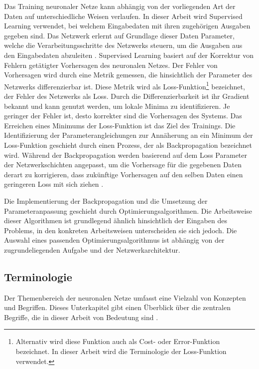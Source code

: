 Das Training neuronaler Netze kann abhängig von der vorliegenden Art der Daten auf unterschiedliche Weisen verlaufen. In dieser Arbeit wird Supervised Learning verwendet, bei welchem Eingabedaten mit ihren zugehörigen Ausgaben gegeben sind. Das Netzwerk erlernt auf Grundlage dieser Daten Parameter, welche die Verarbeitungsschritte des Netzwerks steuern, um die Ausgaben aus den Eingabedaten abzuleiten \cite{nn_terminology}. Supervised Learning basiert auf der Korrektur von Fehlern getätigter Vorhersagen des neuronalen Netzes. Der Fehler von Vorhersagen wird durch eine Metrik gemessen, die hinsichtlich der Parameter des Netzwerks differenzierbar ist. Diese Metrik wird als Loss-Funktion\footnote{Alternativ wird diese Funktion auch als Cost- oder Error-Funktion bezeichnet. In dieser Arbeit wird die Terminologie der Loss-Funktion verwendet.} bezeichnet, der Fehler des Netzwerks als Loss. Durch die Differenzierbarkeit ist ihr Gradient bekannt und kann genutzt werden, um lokale Minima zu identifizieren. Je geringer der Fehler ist, desto korrekter sind die Vorhersagen des Systems. Das Erreichen eines Minimums der Loss-Funktion ist das Ziel des Trainings. Die Identifizierung der Parameterangleichungen zur Annäherung an ein Minimum der Loss-Funktion geschieht durch einen Prozess, der als Backpropagation bezeichnet wird. Während der Backpropagation werden basierend auf dem Loss Parameter der Netzwerkschichten angepasst, um die Vorhersage für die gegebenen Daten derart zu korrigieren, dass zukünftige Vorhersagen auf den selben Daten einen geringeren Loss mit sich ziehen \cite{cv_general}.

Die Implementierung der Backpropagation und die Umsetzung der Parameteranpassung geschieht durch Optimierungsalgorithmen. Die Arbeitsweise dieser Algorithmen ist grundlegend ähnlich hinsichtlich der Eingaben des Problems, in den konkreten Arbeitsweisen unterscheiden sie sich jedoch. Die Auswahl eines passenden Optimierungsalgorithmus ist abhängig von der zugrundeliegenden Aufgabe und der Netzwerkarchitektur.


\subsection{Terminologie}
\label{sec:nn_terminologie}

Der Themenbereich der neuronalen Netze umfasst eine Vielzahl von Konzepten und Begriffen. Dieses Unterkapitel gibt einen Überblick über die zentralen Begriffe, die in dieser Arbeit von Bedeutung sind \cite{nn_terminology}.

